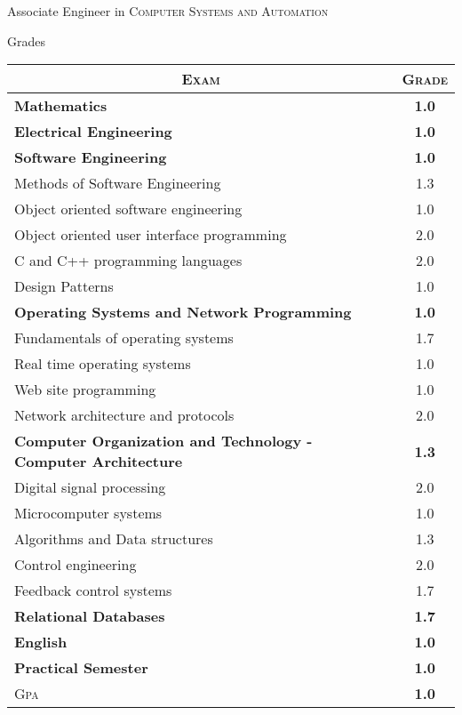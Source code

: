 \documentclass[a4paper,10pt]{article}
\begin{document}
\par{\centering\Large \hypertarget{grds_siemens}{Associate Engineer in \textsc{Computer Systems and Automation}}\par}\large{\centering Grades\par}\normalsize
\begin{center}
\begin{tabular}{lc}
\multicolumn{1}{c}{\textsc{Exam}}&\textsc{Grade}\\ \hline
\textbf{Mathematics}	&\textbf{1.0}\\ \hline
\textbf{Electrical Engineering}	&\textbf{1.0}\\ \hline
\textbf{Software Engineering}&\textbf{1.0}\\ 
\hspace{5 mm}Methods of Software Engineering	&1.3\\
\hspace{5 mm}Object oriented software engineering	&1.0\\
\hspace{5 mm}Object oriented user interface programming &2.0\\
\hspace{5 mm}C and C++ programming languages	&2.0\\
\hspace{5 mm}Design Patterns	&1.0\\ \hline
\textbf{Operating Systems and Network Programming}&\textbf{1.0}\\
\hspace{5 mm}Fundamentals of operating systems &1.7\\
\hspace{5 mm}Real time operating systems	&1.0\\
\hspace{5 mm}Web site programming	&1.0\\ 		
\hspace{5 mm}Network architecture and protocols	&2.0\\ \hline
\textbf{Computer Organization and Technology - Computer Architecture}&\textbf{1.3}\\
\hspace{5 mm}Digital signal processing	&2.0\\
\hspace{5 mm}Microcomputer systems	&1.0\\
\hspace{5 mm}Algorithms and Data structures	&1.3\\ 
\hspace{5 mm}Control engineering	&2.0\\ 
\hspace{5 mm}Feedback control systems	&1.7\\ \hline
\textbf{Relational Databases}	&\textbf{1.7}\\  \hline
\textbf{English}	&\textbf{1.0}\\ \hline
\textbf{Practical Semester}	&\textbf{1.0}\\ \cline{1-2}\cline{1-2}
\textsc{Gpa}&\textbf{1.0}
\end{tabular}
\end{center}
\end{document}
